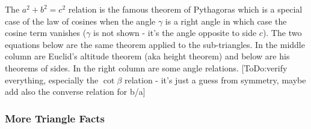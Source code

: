 \medskip
{}
\medskip


The $a^2 + b^2 = c^2$ relation is the famous theorem of Pythagoras which is a special case of the law of cosines when the angle $\gamma$ is a right angle in which case the cosine term vanishes ($\gamma$ is not shown - it's the angle opposite to side $c$). The two equations below are the same theorem applied to the sub-triangles. In the middle column are Euclid's altitude theorem (aka height theorem) and below are his theorems of sides. In the right column are some angle relations. [ToDo:verify everything, especially the $\cot \beta$ relation - it's just a guess from symmetry, maybe add also the converse relation for b/a] 





\subsubsection{More Triangle Facts}

